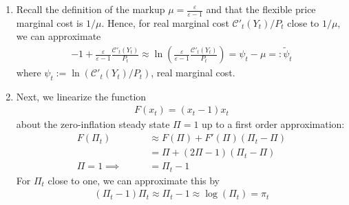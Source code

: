 \documentclass[12pt]{article}
\theoremstyle{plain}
\theoremstyle{definition}
\theoremstyle{remark}
\newcommand{\calC}{\mathcal{C}}
\begin{document}
    \begin{enumerate}[label=(\roman*)]
      \item Recall the definition of the markup
        $\mu=\frac{\varepsilon}{\varepsilon-1}$ and that the flexible
        price marginal cost is $1/\mu$. Hence, for real marginal
        cost $\calC'_t(Y_t)/P_t$ close to $1/\mu$, we can approximate
        \begin{align*}
          -1 +
          \frac{\varepsilon}{\varepsilon-1}\frac{\calC'_t(Y_t)}{P_t}
          \approx \ln\left(
            \frac{\varepsilon}{\varepsilon-1}
            \frac{\calC'_t(Y_t)}{P_t}
            \right)
          = \psi_t - \mu =: \tilde{\psi}_t
        \end{align*}
        where $\psi_t:=\ln(\calC'_t(Y_t)/P_t)$, real marginal cost.

      \item Next, we linearize the function
        \begin{align*}
          F(x_t) = (x_t-1)x_t
        \end{align*}
        about the zero-inflation steady state $\Pi=1$ up to a first
        order approximation:
        \begin{align*}
          F(\Pi_t)
          &\approx F(\Pi) + F'(\Pi)(\Pi_t-\Pi)
          \\
          &= \Pi + (2\Pi-1)(\Pi_t-\Pi)
          \\
          \text{$\Pi=1$}\implies\qquad
          &= \Pi_t-1
        \end{align*}
        For $\Pi_t$ close to one, we can approximate this by
        \begin{align*}
          (\Pi_t-1)\Pi_t
          \approx \Pi_t-1 \approx \log(\Pi_t) = \pi_t
        \end{align*}


\end{enumerate}
\end{document}
